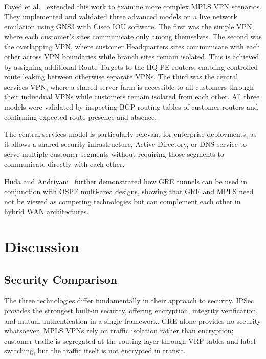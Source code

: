 \documentclass[conference]{IEEEtran}
\begin{document}
Fayed et al.~\cite{fayed2024} extended this work to examine more
complex MPLS VPN scenarios. They implemented and validated three
advanced models on a live network emulation using GNS3 with Cisco
IOU software. The first was the simple VPN, where each customer's
sites communicate only among themselves. The second was the
overlapping VPN, where customer Headquarters sites communicate
with each other across VPN boundaries while branch sites remain
isolated. This is achieved by assigning additional Route Targets
to the HQ PE routers, enabling controlled route leaking between
otherwise separate VPNs. The third was the central services VPN,
where a shared server farm is accessible to all customers through
their individual VPNs while customers remain isolated from each
other. All three models were validated by inspecting BGP routing
tables of customer routers and confirming expected route presence
and absence.

The central services model is particularly relevant for enterprise
deployments, as it allows a shared security infrastructure, Active
Directory, or DNS service to serve multiple customer segments
without requiring those segments to communicate directly with
each other.

Huda and Andriyani~\cite{huda2025} further demonstrated how GRE
tunnels can be used in conjunction with OSPF multi-area designs,
showing that GRE and MPLS need not be viewed as competing
technologies but can complement each other in hybrid WAN
architectures.

\section{Discussion}
\label{sec:discussion}

\subsection{Security Comparison}

The three technologies differ fundamentally in their approach to
security. IPSec provides the strongest built-in security, offering
encryption, integrity verification, and mutual authentication in
a single framework. GRE alone provides no security whatsoever.
MPLS VPNs rely on traffic isolation rather than encryption;
customer traffic is segregated at the routing layer through VRF
tables and label switching, but the traffic itself is not
encrypted in transit.
\end{document}
